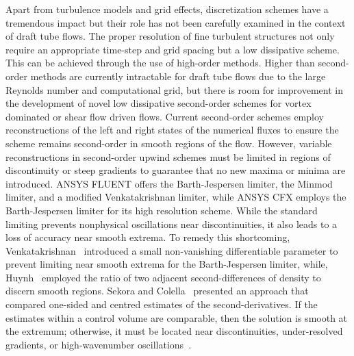 Apart from turbulence models and grid effects, discretization schemes have a tremendous impact but their role has not been carefully examined in the context of draft tube flows. The proper resolution of fine turbulent structures not only require an appropriate time-step and grid spacing but a low dissipative scheme. This can be achieved through the use of high-order methods. Higher than second-order methods are currently intractable for draft tube flows due to the large Reynolds number and computational grid, but there is room for improvement in the development of novel low dissipative second-order schemes for vortex dominated or shear flow driven flows. Current second-order schemes employ reconstructions of the left and right states of the numerical fluxes to ensure the scheme remains second-order in smooth regions of the flow. However, variable reconstructions in second-order upwind schemes must be limited in regions of discontinuity or steep gradients to guarantee that no new maxima or minima are introduced. ANSYS FLUENT offers the Barth-Jespersen limiter, the Minmod limiter, and a modified Venkatakrishnan limiter, while ANSYS CFX employs the Barth-Jespersen limiter for its high resolution scheme. While the standard limiting prevents nonphysical oscillations near discontinuities, it also leads to a loss of accuracy near smooth extrema. To remedy this shortcoming, Venkatakrishnan~\cite{venkatakrishnanaccuracy} introduced a small non-vanishing differentiable parameter to prevent limiting near smooth extrema for the Barth-Jespersen limiter, while, Huynh~\cite{huynh1995accurate} employed the ratio of two adjacent second-differences of density to discern smooth regions. Sekora and Colella~\cite{sekora2009extremum} presented an approach that compared one-sided and centred estimates of the second-derivatives. If the estimates within a control volume are comparable, then the solution is smooth at the extremum; otherwise, it must be located near discontinuities, under-resolved gradients, or high-wavenumber oscillations~\cite{sekora2009extremum}. 


